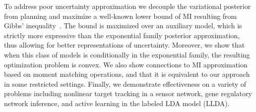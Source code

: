 To address poor uncertainty approximation we decouple the variational
posterior from planning and maximize a well-known lower bound of MI
resulting from Gibbs' inequality~\citep{agakov2004algorithm}.  The
bound is maximized over an auxiliary model, which is strictly more
expressive than the exponential family posterior approximation, thus
allowing for better representations of uncertainty.  Moreover, we show
that when this class of models is conditionally in the exponential
family, the resulting optimization problem is convex.  We also show
connections to MI approximation based on moment matching operations,
and that it is equivalent to our approach in some restricted settings.
Finally, we demonstrate effectiveness on a variety of problems
including nonlinear target tracking in a sensor network, gene
regulatory network inference, and active learning in the labeled LDA
model (LLDA).


